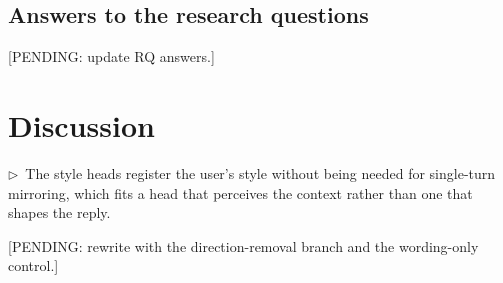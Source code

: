 \documentclass[11pt]{article}
\newcommand{\flow}[1]{\par\noindent\textcolor{blue!60!black}{\small$\triangleright$\ #1}\par\medskip}
\newcommand{\pending}[1]{\par\noindent\textcolor{orange!80!black}{\small[PENDING: #1]}\par\medskip}
\begin{document}
\subsection{Answers to the research questions}
\pending{update RQ answers.}

\section{Discussion}

\flow{The style heads register the user's style without being needed for single-turn mirroring, which fits a head that perceives the context rather than one that shapes the reply.}
\pending{rewrite with the direction-removal branch and the wording-only control.}
\end{document}
